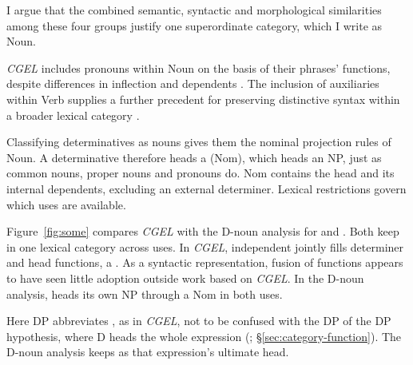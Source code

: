 \documentclass[12pt]{article}
\begin{document}
I argue that the combined semantic, syntactic and morphological similarities among these four groups justify one superordinate category, which I write as Noun.

\textit{CGEL} includes pronouns within Noun on the basis of their phrases' functions, despite differences in inflection and dependents \citep[327--328]{huddleston2002}. The inclusion of auxiliaries within Verb supplies a further precedent for preserving distinctive syntax within a broader lexical category \citep{pullumwilson1977}.

Classifying determinatives as nouns gives them the nominal projection rules of Noun. A determinative therefore heads a  (Nom), which heads an NP, just as common nouns, proper nouns and pronouns do. Nom contains the head and its internal dependents, excluding an external determiner. Lexical restrictions govern which uses are available.

Figure~\ref{fig:some} compares \textit{CGEL} with the D-noun analysis for  and . Both keep  in one lexical category across uses. In \textit{CGEL}, independent  jointly fills determiner and head functions, a  \citep[410--412]{huddleston2002}. As a syntactic representation, fusion of functions appears to have seen little adoption outside work based on \textit{CGEL}. In the D-noun analysis,  heads its own NP through a Nom in both uses.

Here DP abbreviates , as in \textit{CGEL}, not to be confused with the DP of the DP hypothesis, where D heads the whole expression  (\citealp{abney1987}; §\ref{sec:category-function}). The D-noun analysis keeps  as that expression's ultimate head.
\end{document}
